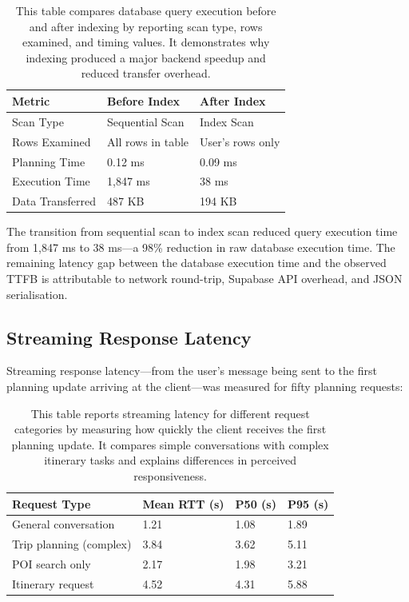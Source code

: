 \documentclass[12pt,a4paper]{report}
\newcommand{\tableexpl}[1]{\caption*{\small #1}}
\begin{document}
\begin{table}[H]
\centering
\caption{PostgreSQL Query Execution Plan Comparison}
\tableexpl{This table compares database query execution before and after indexing by reporting scan type, rows examined, and timing values. It demonstrates why indexing produced a major backend speedup and reduced transfer overhead.}
\label{tab:query_plan}
\begin{tabular}{lll}
\toprule
\textbf{Metric} & \textbf{Before Index} & \textbf{After Index} \\
\midrule
Scan Type           & Sequential Scan      & Index Scan \\
Rows Examined       & All rows in table    & User's rows only \\
Planning Time       & 0.12 ms              & 0.09 ms \\
Execution Time      & 1,847 ms             & 38 ms \\
Data Transferred    & 487 KB               & 194 KB \\
\bottomrule
\end{tabular}
\end{table}

The transition from sequential scan to index scan reduced query execution time from 1,847 ms to 38 ms---a 98\% reduction in raw database execution time. The remaining latency gap between the database execution time and the observed TTFB is attributable to network round-trip, Supabase API overhead, and JSON serialisation.

\subsection{Streaming Response Latency}

Streaming response latency---from the user's message being sent to the first planning update arriving at the client---was measured for fifty planning requests:

\begin{table}[H]
\centering
\caption{Streaming Response Latency (n=50)}
\tableexpl{This table reports streaming latency for different request categories by measuring how quickly the client receives the first planning update. It compares simple conversations with complex itinerary tasks and explains differences in perceived responsiveness.}
\label{tab:ws_rtt}
\begin{tabular}{llll}
\toprule
\textbf{Request Type} & \textbf{Mean RTT (s)} & \textbf{P50 (s)} & \textbf{P95 (s)} \\
\midrule
General conversation     & 1.21 & 1.08 & 1.89 \\
Trip planning (complex)  & 3.84 & 3.62 & 5.11 \\
POI search only          & 2.17 & 1.98 & 3.21 \\
Itinerary request        & 4.52 & 4.31 & 5.88 \\
\bottomrule
\end{tabular}
\end{table}
\end{document}
